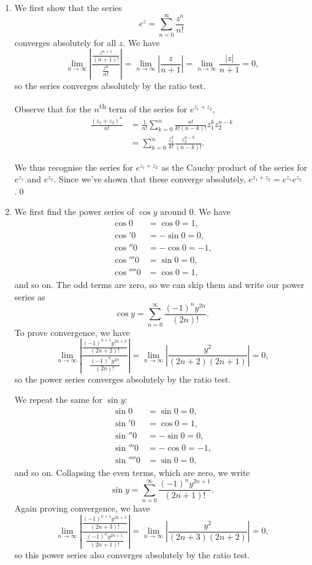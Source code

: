 \documentclass[oneside]{article}
\newcommand\abs[1]{\left|#1\right|}
\begin{document}
\begin{enumerate}[label=\textbf{(\alph*)}]
    \item We first show that the series \[
      e^z = \sum_{n=0}^\infty \frac{z^n}{n!}
    \] converges absolutely for all $z$. We have \[
      \lim_{n\to\infty}\abs{\frac{\frac{z^{n+1}}{(n+1)!}}{\frac{z^n}{n!}}}
      = \lim_{n\to\infty}\abs{\frac{z}{n+1}}
      = \lim_{n\to\infty}\frac{\abs{z}}{n+1}
      = 0\text{,}
    \] so the series converges absolutely by the ratio test.

    Observe that for the $n$\textsuperscript{th} term of the series for
    $e^{z_1+z_2}$,\begin{align*}
      \frac{(z_1+z_2)^n}{n!}
      &= \frac{1}{n!}\sum_{k=0}^n \frac{n!}{k!(n-k)!} z_1^k z_2^{n-k} \\
      &= \sum_{k=0}^n \frac{z_1^k}{k!} \frac{z_2^{n-k}}{(n-k)!} \text{.}
    \end{align*}

    We thus recognise the series for $e^{z_1 + z_2}$ as the Cauchy product of
    the series for $e^{z_1}$ and $e^{z_2}$. Since we've shown that these
    converge absolutely, $e^{z_1 + z_2} = e^{z_1}e^{z_2}$.\qed

    \item We first find the power series of $\cos y$ around $0$. We have
    \begin{align*}
      \cos0 &= \cos 0 = 1\text{,} \\
      \cos'0 &= -\sin 0 = 0\text{,} \\
      \cos''0 &= -\cos 0 = -1\text{,} \\
      \cos'''0 &= \sin 0 = 0\text{,} \\
      \cos''''0 &= \cos 0 = 1\text{,}
    \end{align*} and so on. The odd terms are zero, so we can skip them and
    write our power series as \[
      \cos y = \sum_{n=0}^\infty \frac{(-1)^ny^{2n}}{(2n)!} \text{.}
    \] To prove convergence, we have\[
      \lim_{n\to\infty}\abs{\frac{\frac{(-1)^{n+1}y^{2n+2}}{(2n+2)!}}
      {\frac{(-1)^ny^{2n}}{(2n)!}}}
      = \lim_{n\to\infty}\abs{\frac{y^2}{(2n+2)(2n+1)}} = 0 \text{,}
    \] so the power series converges absolutely by the ratio test.

    We repeat the same for $\sin y$: \begin{align*}
      \sin0 &= \sin 0 = 0\text{,} \\
      \sin'0 &= \cos 0 = 1\text{,} \\
      \sin''0 &= -\sin 0 = 0\text{,} \\
      \sin'''0 &= -\cos 0 = -1\text{,} \\
      \sin''''0 &= \sin 0 = 0\text{,}
    \end{align*} and so on. Collapsing the even terms, which are zero, we write \[
      \sin y = \sum_{n=0}^\infty \frac{(-1)^ny^{2n+1}}{(2n+1)!} \text{.}
    \] Again proving convergence, we have\[
      \lim_{n\to\infty}\abs{\frac{\frac{(-1)^{n+1}y^{2n+3}}{(2n+3)!}}
      {\frac{(-1)^ny^{2n+1}}{(2n+1)!}}}
      = \lim_{n\to\infty}\abs{\frac{y^2}{(2n+3)(2n+2)}}
      = 0\text{,}
    \] so this power series also converges absolutely by the ratio test.


\end{enumerate}
\end{document}

